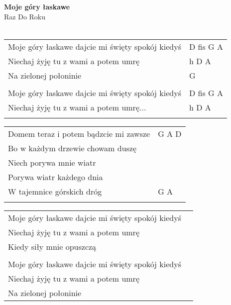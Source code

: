 \documentclass[a5paper]{article}
\begin{document}


\noindent
\fontsize{12pt}{15pt}\selectfont
\textbf{Moje góry łaskawe} \\
\fontsize{8pt}{10pt}\selectfont
Raz Do Roku \\ \\
\fontsize{10pt}{12pt}\selectfont
{}
\begin{tabular}{@{}p{8.50cm}p{3cm}@{}}
\noindent
Moje góry łaskawe dajcie mi święty spokój kiedyś & D fis G A \\
Niechaj żyję tu z wami a potem umrę & h D A \\
Na zielonej połoninie & G \\ \\
 
Moje góry łaskawe dajcie mi święty spokój kiedyś & D fis G A \\
Niechaj żyję tu z wami a potem umrę... & h D A \\ \\
\end{tabular}

\noindent
\begin{tabular}{@{}p{7.50cm}p{3cm}@{}} 
Domem teraz i potem bądzcie mi zawsze & G A D \\
Bo w każdym drzewie chowam duszę \\
Niech porywa mnie wiatr \\
Porywa wiatr każdego dnia \\
W tajemnice górskich dróg & G A \\ \\
 \end{tabular}

\noindent
\begin{tabular}{@{}p{7.50cm}p{3cm}@{}}
Moje góry łaskawe dajcie mi święty spokój kiedyś \\
Niechaj żyję tu z wami a potem umrę \\
Kiedy siły mnie opuszczą \\ \\
 
Moje góry łaskawe dajcie mi święty spokój kiedyś \\
Niechaj żyję tu z wami a potem umrę \\
Na zielonej połoninie
\end{tabular}
\end{document}
